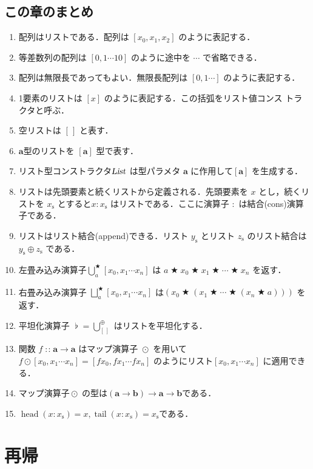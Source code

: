 \documentclass[a5paper,twoside,fleqn,draft]{jsbook}
\newcommand{\mEmptyList}{{[\,]}}
\newcommand{\mSpecialFunc}[1]{\mathrm{#1}}
\DeclareMathOperator{\mHead}{\mSpecialFunc{head}}
\DeclareMathOperator{\mTail}{\mSpecialFunc{tail}}
\DeclareMathOperator{\mAppend}{\oplus}
\DeclareMathOperator{\mBinOp}{\bigstar}
\DeclareMathOperator*{\mFold}{\bigcup}
\DeclareMathOperator*{\mFoldRight}{\bigsqcup}
\DeclareMathOperator{\mFuncArrow}{\rightarrow}
\DeclareMathOperator{\mIn}{{:\!:}}
\DeclareMathOperator{\mJoinList}{\flat} %
\DeclareMathOperator{\mMapList}{\odot}
\newcommand{\mType}[1]{\mathbf{#1}} %
\newcommand{\mA}{\mType{a}}
\newcommand{\mB}{\mType{b}}
\newcommand{\mTypeConstructor}[1]{\textsl{#1}}
\DeclareMathOperator{\mListTypeConstructor}{\mTypeConstructor{List}}
\newcommand{\mList}[1]{{#1}_\mathrm{s}}
\newcommand{\mProjEXP}[2]{#1\mFuncArrow#2} %
\begin{document}
\section{この章のまとめ}

\begin{enumerate}
\item 配列はリストである．配列は $[x_0,x_1,x_2]$ のように表記する．
\item 等差数列の配列は $[0,1\dotsb10]$ のように途中を $\dotsb$ で省略できる．
\item 配列は無限長であってもよい．無限長配列は $[0,1\dotsb]$ のように表記する．
\item 1要素のリストは $[x]$ のように表記する．この括弧をリスト値コンス
  トラクタと呼ぶ．
\item 空リストは $\mEmptyList$ と表す．
\item $\mA $型のリストを $[\mA]$ 型で表す．
\item リスト型コンストラクタ$\mListTypeConstructor$ は型パラメタ $\mA$ に作用して$[\mA]$ を生成する．
\item リストは先頭要素と続くリストから定義される．先頭要素を $x$ とし，続くリストを $\mList{x}$ とすると$x:\mList{x}$ はリストである．ここに演算子 $:$ は結合(cons)演算子である．
\item リストはリスト結合(append)できる．リスト $\mList{y}$ とリスト $\mList{z}$ のリスト結合は $\mList{y}\mAppend\mList{z}$ である．
\item 左畳み込み演算子$\mFold^{\mBinOp}_a[x_0,x_1\dotsb x_n]$ は $a\mBinOp x_0\mBinOp x_1\mBinOp\dotsb\mBinOp x_n$ を返す．
\item 右畳み込み演算子 $\mFoldRight^{\mBinOp}_{a}[x_0,x_1\dotsb x_n]$ は$(x_0\mBinOp(x_1\mBinOp\dotsb\mBinOp(x_n\mBinOp a)))$ を返す．
\item 平坦化演算子 $\mJoinList=\mFold_\mEmptyList^{\mAppend}$ はリストを平坦化する．
\item 関数 $f\mIn\mProjEXP{\mA }{\mA }$ はマップ演算子 $\mMapList$ を用いて $f\mMapList[x_0,x_1\dotsb x_n]=[fx_0,fx_1\dotsb fx_n]$ のようにリスト$[x_0,x_1\dotsb x_n]$ に適用できる．
\item マップ演算子$\mMapList$ の型は$\mProjEXP{(\mProjEXP{\mA }{\mB})}{\mProjEXP{\mA }{\mB }}$である．
\item $\mHead(x:\mList{x})=x,\mTail(x:\mList{x})=\mList{x}$である．
\end{enumerate}


\chapter{再帰}
\label{ch:recursion}
\end{document}
